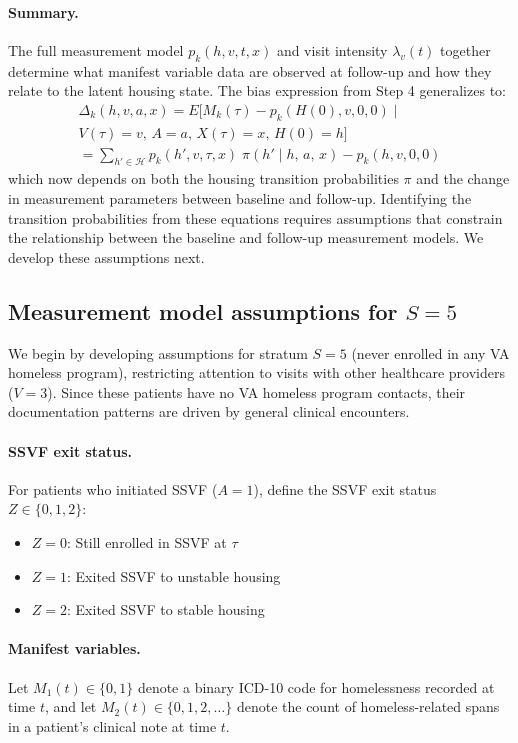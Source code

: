\paragraph{Summary.} The full measurement model $p_k(h, v, t, x)$ and visit intensity $\lambda_v(t)$ together determine what manifest variable data are observed at follow-up and how they relate to the latent housing state. The bias expression from Step 4 generalizes to:
\begin{multline*}
    \Delta_k(h, v, a, x) = E\big[M_k(\tau) - p_k(H(0), v, 0, 0) \mid \\
    V(\tau)=v,\, A=a,\, X(\tau)=x,\, H(0)=h\big] \\
    = \sum_{h' \in \mathcal{H}} p_k(h', v, \tau, x) \; \pi(h' \mid h,\, a,\, x) - p_k(h, v, 0, 0)
\end{multline*}
which now depends on both the housing transition probabilities $\pi$ and the change in measurement parameters between baseline and follow-up. Identifying the transition probabilities from these equations requires assumptions that constrain the relationship between the baseline and follow-up measurement models. We develop these assumptions next.

\subsection{Measurement model assumptions for $S=5$}

We begin by developing assumptions for stratum $S=5$ (never enrolled in any VA homeless program), restricting attention to visits with other healthcare providers ($V=3$). Since these patients have no VA homeless program contacts, their documentation patterns are driven by general clinical encounters.

\paragraph{SSVF exit status.} For patients who initiated SSVF ($A=1$), define the SSVF exit status $Z \in \{0, 1, 2\}$:
\begin{itemize}
    \item $Z=0$: Still enrolled in SSVF at $\tau$
    \item $Z=1$: Exited SSVF to unstable housing
    \item $Z=2$: Exited SSVF to stable housing
\end{itemize}

\paragraph{Manifest variables.} Let $M_1(t) \in \{0, 1\}$ denote a binary ICD-10 code for homelessness recorded at time $t$, and let $M_2(t) \in \{0, 1, 2, \ldots\}$ denote the count of homeless-related spans in a patient's clinical note at time $t$.

